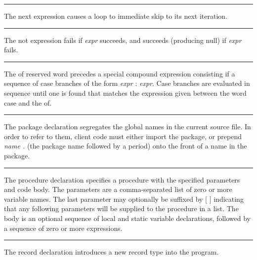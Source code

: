 \bigskip\hrule\vspace{0.1cm}

\noindent
{}The \textsf{next} expression causes a loop to
immediate skip to its next iteration.

\bigskip\hrule\vspace{0.1cm}

\noindent
{}The \textsf{not} expression fails if \textit{expr} succeeds,
and succeeds (producing null) if \textit{expr} fails.

\bigskip\hrule\vspace{0.1cm}

\noindent
{}The \textsf{of} reserved word precedes a special compound
expression consisting if a sequence of case branches of the form
\textit{expr} : \textit{expr}. Case branches are evaluated in sequence
until one is found that matches the expression given between the word
\textsf{case} and the \textsf{of}.

\bigskip\hrule\vspace{0.1cm}

\noindent
{}The \textsf{package} declaration segregates the global
names in the current source file. In order to refer to them, client
code must either import the package, or prepend \textsf{\textit{name
.}} (the package name followed by a period) onto the front of a name in
the package.

\bigskip\hrule\vspace{0.1cm}

\noindent
{}The \textsf{procedure} declaration specifies a
procedure with the specified parameters and code body. The parameters
are a comma-separated list of zero or more variable names. The last
parameter may optionally be suffixed by [ ] indicating that any
following parameters will be supplied to the procedure in a list. The
body is an optional sequence of local and static variable declarations,
followed by a sequence of zero or more expressions.

\bigskip\hrule\vspace{0.1cm}

\noindent
{}The \textsf{record} declaration introduces a new record
type into the program.


